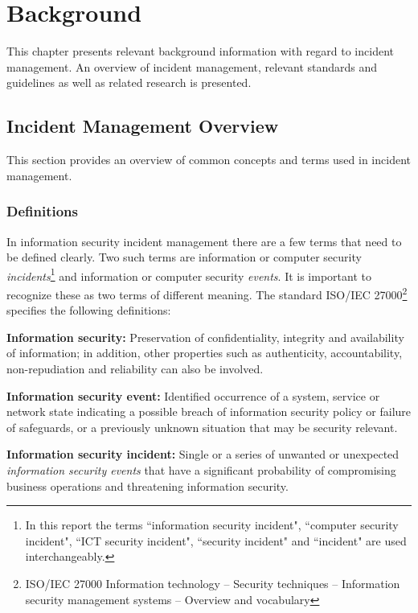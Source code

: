 \chapter{Background}
\label{chp:background}
This chapter presents relevant background information with regard to incident management. An overview of incident management, relevant standards and guidelines as well as related research is presented.

\section{Incident Management Overview}
This section provides an overview of common concepts and terms used in incident management.
\subsection{Definitions}
\label{sec:Definitions}
In information security incident management there are a few terms that need to be defined clearly. Two such terms are information or computer security \textit{incidents}\footnote{In this report the terms ``information security incident", ``computer security incident", ``ICT security incident", ``security incident" and ``incident" are used interchangeably.} and information or computer security \textit{events}. It is important to recognize these as two terms of different meaning. The standard \acs{ISO}/\acs{IEC} 27000\footnote{\acs{ISO}/\acs{IEC} 27000 Information technology -- Security techniques -- Information security management systems -- Overview and vocabulary} \cite{ISO/IEC27000} specifies the following definitions:

\textbf{Information security:} Preservation of confidentiality, integrity and availability of information; in addition, other properties such as authenticity, accountability, non-repudiation and reliability can also be involved.

\textbf{Information security event:} Identified occurrence of a system, service or network state indicating a possible breach of information security policy or failure of safeguards, or a previously unknown situation that may be security relevant.

\textbf{Information security incident:} Single or a series of unwanted or unexpected \emph{information security events} that have a significant probability of compromising business operations and threatening information security.

